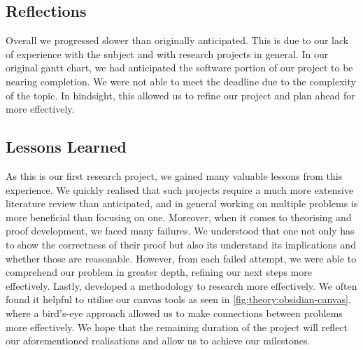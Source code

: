 \subsection{Reflections}

Overall we progressed slower than originally anticipated. This 
is due to our lack of experience with the subject and with research projects in general.
In our original gantt chart, we had anticipated the software portion of our project
to be nearing completion. We were not able to meet the deadline due to the complexity
of the topic. In hindsight, this allowed us to refine our project and plan ahead
for more effectively. 

\subsection{Lessons Learned}

As this is our first research project, we gained many valuable lessons from this experience.
We quickly realised that such projects require a much more extensive literature review than anticipated, 
and in general working on multiple problems is more beneficial than focusing on one.
Moreover, when it comes to theorising and proof development, we faced many failures.
We understood that one not only has to show the correctness of their proof but also its understand its implications
and whether those are reasonable.
However, from each failed attempt, we were able to comprehend our problem in greater depth, refining our next steps more effectively.
Lastly, developed a methodology to research more effectively. We often found it helpful
to utilise our canvas tools as seen in \ref{fig:theory:obsidian-canvas}, where
a bird's-eye approach allowed us to make connections between problems more effectively.
We hope that the remaining duration of the project will reflect our aforementioned realisations
and allow us to achieve our milestones.


